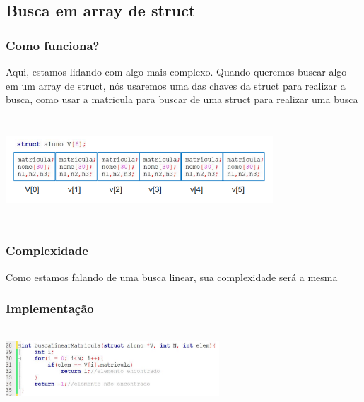 \documentclass{report}
\begin{document}
	\subsection{Busca em array de struct}
	\subsubsection{Como funciona?}
	
	Aqui, estamos lidando com algo mais complexo. Quando queremos buscar algo em um array de struct, nós usaremos uma das chaves da struct para realizar a busca, como usar a matricula para buscar de uma struct para realizar uma busca
	
	\begin{center}
		
		\includegraphics[width=10cm,height=4cm,keepaspectratio=false]{imagens/bstruct.png}
		
	\end{center}
	
	\subsubsection{Complexidade}
	
	Como estamos falando de uma busca linear, sua complexidade será a mesma
	
	\subsubsection{Implementação}
	
	\begin{center}
		
		\includegraphics[width=8cm,height=3cm,keepaspectratio=false]{imagens/bstructimplement.png}
		
	\end{center}
	
\end{document}
